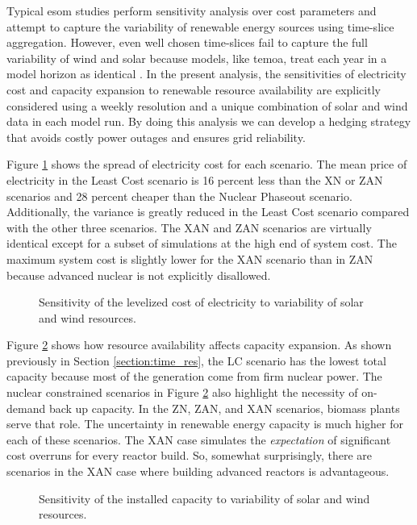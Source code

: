 Typical \gls{esom} studies perform sensitivity analysis over cost parameters and
attempt to capture the variability of renewable energy sources using time-slice
aggregation. However, even well chosen time-slices fail to capture the full variability
of wind and solar because models, like \gls{temoa}, treat each year in a model
horizon as identical \cite{hunter_modeling_2013}. In the present analysis, the
sensitivities of electricity cost and capacity expansion to renewable resource
availability are explicitly considered using a weekly resolution and a unique combination
of solar and wind data in each model run. By doing this analysis we can develop
a hedging strategy that avoids costly power outages and ensures grid reliability.

Figure \ref{fig:obj_cost_plot} shows the spread of electricity cost for each scenario.
The mean price of electricity in the Least Cost scenario is 16 percent less than
the XN or ZAN scenarios and 28 percent cheaper than the Nuclear Phaseout scenario.
Additionally, the variance is greatly reduced in the Least Cost scenario compared
with the other three scenarios. The XAN and ZAN scenarios are virtually identical
except for a subset of simulations at the high end of system cost. The maximum
system cost is slightly lower for the XAN scenario than in ZAN because advanced
nuclear is not explicitly disallowed.

\begin{figure}[H]
  \centering
  \resizebox{0.95\columnwidth}{!}{}
  \caption{Sensitivity of the levelized cost of electricity to variability of
   solar and wind resources.}
  \label{fig:obj_cost_plot}
\end{figure}

Figure \ref{fig:il_capacity} shows how resource availability affects capacity
expansion. As shown previously in Section \ref{section:time_res}, the LC scenario
has the lowest total capacity because most of the generation come from firm nuclear
power. The nuclear constrained scenarios in Figure \ref{fig:il_capacity} also
highlight the necessity of on-demand back up capacity. In the ZN, ZAN, and XAN
scenarios, biomass plants serve that role. The uncertainty in renewable energy
capacity is much higher for each of these scenarios.  The XAN case simulates the
\textit{expectation} of significant cost overruns for every reactor build. So,
somewhat surprisingly, there are scenarios in the XAN case where building
advanced reactors is advantageous.

\begin{figure}[H]
  \centering
  \resizebox{0.95\columnwidth}{!}{}
  \caption{Sensitivity of the installed capacity to variability of
   solar and wind resources.}
  \label{fig:il_capacity}
\end{figure}

